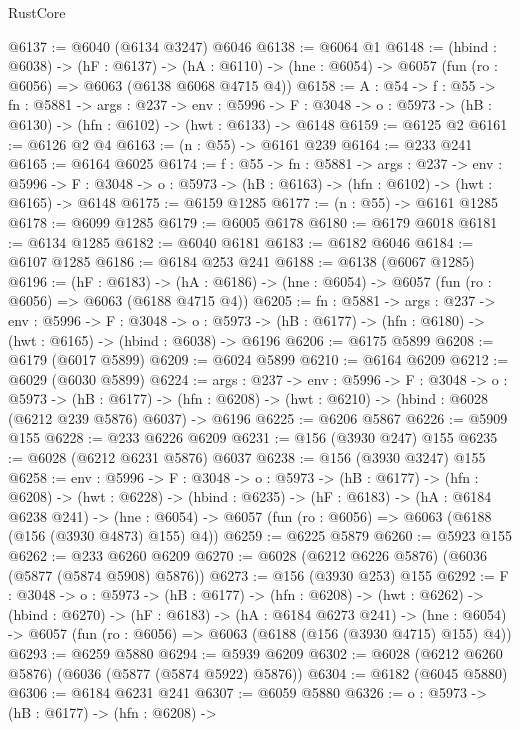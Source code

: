 \begin{lexlean}{RustCore}
\begin{coremodule}
@6137 := @6040 (@6134 @3247) @6046
@6138 := @6064 @1
@6148 := (hbind : @6038) ->
  (hF : @6137) ->
  (hA : @6110) -> (hne : @6054) -> @6057 (fun (ro : @6056) => @6063 (@6138 @6068 @4715 @4))
@6158 := {A : @54} ->
  {f : @55} ->
  {fn : @5881} ->
  {args : @237} ->
  {env : @5996} ->
  {F : @3048} -> {o : @5973} -> (hB : @6130) -> (hfn : @6102) -> (hwt : @6133) -> @6148
@6159 := @6125 @2
@6161 := @6126 @2 @4
@6163 := (n : @55) -> @6161 @239
@6164 := @233 @241
@6165 := @6164 @6025
@6174 := {f : @55} ->
  {fn : @5881} ->
  {args : @237} ->
  {env : @5996} ->
  {F : @3048} -> {o : @5973} -> (hB : @6163) -> (hfn : @6102) -> (hwt : @6165) -> @6148
@6175 := @6159 @1285
@6177 := (n : @55) -> @6161 @1285
@6178 := @6099 @1285
@6179 := @6005 @6178
@6180 := @6179 @6018
@6181 := @6134 @1285
@6182 := @6040 @6181
@6183 := @6182 @6046
@6184 := @6107 @1285
@6186 := @6184 @253 @241
@6188 := @6138 (@6067 @1285)
@6196 := (hF : @6183) ->
  (hA : @6186) -> (hne : @6054) -> @6057 (fun (ro : @6056) => @6063 (@6188 @4715 @4))
@6205 := {fn : @5881} ->
  {args : @237} ->
  {env : @5996} ->
  {F : @3048} ->
  {o : @5973} -> (hB : @6177) -> (hfn : @6180) -> (hwt : @6165) -> (hbind : @6038) -> @6196
@6206 := @6175 @5899
@6208 := @6179 (@6017 @5899)
@6209 := @6024 @5899
@6210 := @6164 @6209
@6212 := @6029 (@6030 @5899)
@6224 := {args : @237} ->
  {env : @5996} ->
  {F : @3048} ->
  {o : @5973} ->
  (hB : @6177) ->
  (hfn : @6208) -> (hwt : @6210) -> (hbind : @6028 (@6212 @239 @5876) @6037) -> @6196
@6225 := @6206 @5867
@6226 := @5909 @155
@6228 := @233 @6226 @6209
@6231 := @156 (@3930 @247) @155
@6235 := @6028 (@6212 @6231 @5876) @6037
@6238 := @156 (@3930 @3247) @155
@6258 := {env : @5996} ->
  {F : @3048} ->
  {o : @5973} ->
  (hB : @6177) ->
  (hfn : @6208) ->
  (hwt : @6228) ->
  (hbind : @6235) ->
  (hF : @6183) ->
  (hA : @6184 @6238 @241) ->
  (hne : @6054) -> @6057 (fun (ro : @6056) => @6063 (@6188 (@156 (@3930 @4873) @155) @4))
@6259 := @6225 @5879
@6260 := @5923 @155
@6262 := @233 @6260 @6209
@6270 := @6028 (@6212 @6226 @5876) (@6036 (@5877 (@5874 @5908) @5876))
@6273 := @156 (@3930 @253) @155
@6292 := {F : @3048} ->
  {o : @5973} ->
  (hB : @6177) ->
  (hfn : @6208) ->
  (hwt : @6262) ->
  (hbind : @6270) ->
  (hF : @6183) ->
  (hA : @6184 @6273 @241) ->
  (hne : @6054) -> @6057 (fun (ro : @6056) => @6063 (@6188 (@156 (@3930 @4715) @155) @4))
@6293 := @6259 @5880
@6294 := @5939 @6209
@6302 := @6028 (@6212 @6260 @5876) (@6036 (@5877 (@5874 @5922) @5876))
@6304 := @6182 (@6045 @5880)
@6306 := @6184 @6231 @241
@6307 := @6059 @5880
@6326 := {o : @5973} ->
  (hB : @6177) ->
  (hfn : @6208) ->

\end{coremodule}
\end{lexlean}
